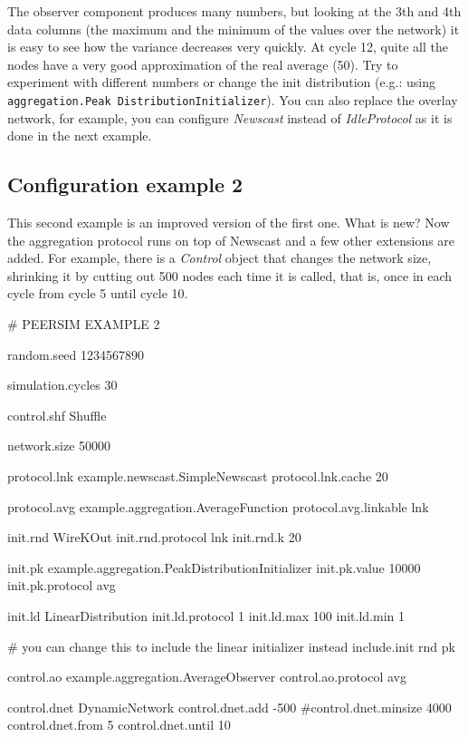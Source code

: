 \documentclass[a4paper,11pt]{article}
\begin{document}
The observer component produces many numbers, but looking at the 3th and
4th data columns (the maximum and the minimum
of the values over the network) it is easy to see how the variance
decreases very quickly.
At cycle 12, quite all the nodes have
a very good approximation of the real average (50). Try to experiment
with different numbers or change the init distribution (e.g.:
using \texttt{aggregation.Peak DistributionInitializer}).
You can also replace the overlay network, for example, you can configure
\emph{Newscast} instead of \emph{IdleProtocol} as it is done in the next
example.


\subsection{Configuration example 2}

This second example is an improved version of the first one. What is
new? Now the aggregation protocol runs on top of Newscast and a
few other extensions are added. For example, there is
a \emph{Control} object that changes the network size, shrinking it by
cutting out 500 nodes each time it is called, that is, once in each cycle
from cycle 5 until cycle 10.

\footnotesize
\begin{listing}{1}
# PEERSIM EXAMPLE 2

random.seed 1234567890

simulation.cycles 30

control.shf Shuffle

network.size 50000
 
protocol.lnk example.newscast.SimpleNewscast
protocol.lnk.cache 20

protocol.avg example.aggregation.AverageFunction
protocol.avg.linkable lnk

init.rnd WireKOut
init.rnd.protocol lnk
init.rnd.k 20

init.pk example.aggregation.PeakDistributionInitializer
init.pk.value 10000
init.pk.protocol avg

init.ld LinearDistribution
init.ld.protocol 1
init.ld.max 100
init.ld.min 1

# you can change this to include the linear initializer instead
include.init rnd pk 

control.ao example.aggregation.AverageObserver
control.ao.protocol avg

control.dnet DynamicNetwork
control.dnet.add -500
#control.dnet.minsize 4000
control.dnet.from 5
control.dnet.until 10
\end{listing}
\normalsize
\end{document}
